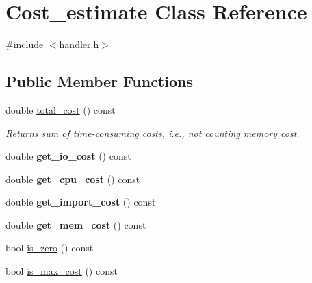 \hypertarget{classCost__estimate}{}\section{Cost\+\_\+estimate Class Reference}
\label{classCost__estimate}


{\ttfamily \#include $<$handler.\+h$>$}

\subsection*{Public Member Functions}
\begin{DoxyCompactItemize}
\item 
\mbox{\label{classCost__estimate_aaee36d8ce052d3e5abd0b0f2af8c00ae}} 
double \mbox{\hyperlink{classCost__estimate_aaee36d8ce052d3e5abd0b0f2af8c00ae}{total\+\_\+cost}} () const
\begin{DoxyCompactList}\small\item\em Returns sum of time-\/consuming costs, i.\+e., not counting memory cost. \end{DoxyCompactList}\item 
\mbox{\label{classCost__estimate_ab04d14da84c3b509c258aca179447088}} 
double {\bfseries get\+\_\+io\+\_\+cost} () const
\item 
\mbox{\label{classCost__estimate_a9337f158e42397b1bc397b8505cd475c}} 
double {\bfseries get\+\_\+cpu\+\_\+cost} () const
\item 
\mbox{\label{classCost__estimate_abb8b3a595443e9f46cc252e21a993fc9}} 
double {\bfseries get\+\_\+import\+\_\+cost} () const
\item 
\mbox{\label{classCost__estimate_aac6177056f79adaafc4b3d5630ae11c6}} 
double {\bfseries get\+\_\+mem\+\_\+cost} () const
\item 
bool \mbox{\hyperlink{classCost__estimate_ad833785551022bb3aa4efe72a463d4ec}{is\+\_\+zero}} () const
\item 
bool \mbox{\hyperlink{classCost__estimate_a7fd206eab066d970cc3ebc8e17753a4f}{is\+\_\+max\+\_\+cost}} () const
\item 
\mbox{\label{classCost__estimate_a39433a1e8b2745bf3df76b08f5ffff65}} 

\end{DoxyCompactItemize}
